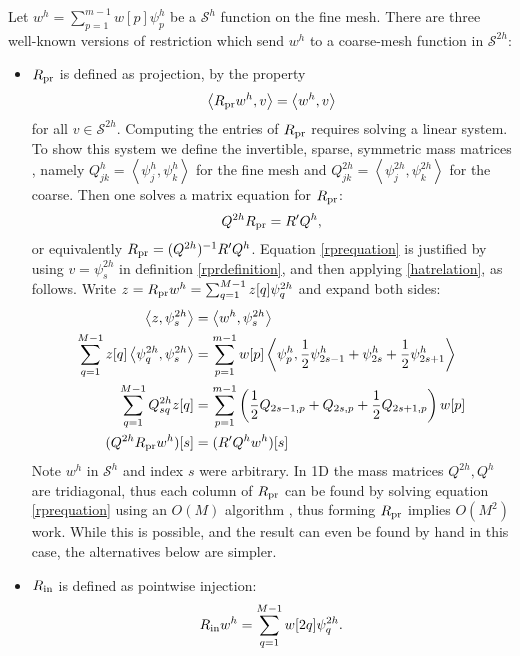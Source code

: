 \documentclass[letterpaper,final,12pt,reqno]{amsart}
\newcommand{\ip}[2]{\left<#1,#2\right>}
\begin{document}
Let $w^h = \sum_{p=1}^{m-1} w[p] \psi_p^{h}$ be a $\mathcal{S}^h$ function on the fine mesh.  There are three well-known versions of restriction which send $w^h$ to a coarse-mesh function in $\mathcal{S}^{2h}$:
\begin{itemize}
\item $R_{\text{pr}}$ is defined as projection, by the property
\begin{equation}
  \ip{\Rpr w^h}{v} = \ip{w^h}{v} \label{rprdefinition}
\end{equation}
for all $v\in \mathcal{S}^{2h}$.  Computing the entries of $R_{\text{pr}}$ requires solving a linear system.  To show this system we define the invertible, sparse, symmetric mass matrices \cite{Elmanetal2014}, namely $Q_{jk}^{h} = \ip{\psi_j^{h}}{\psi_k^{h}}$ for the fine mesh and $Q_{jk}^{2h} = \ip{\psi_j^{2h}}{\psi_k^{2h}}$ for the coarse.  Then one solves a matrix equation for $R_{\text{pr}}$:
\begin{equation}
  Q^{2h} R_{\text{pr}} = R' Q^{h},  \label{rprequation}
\end{equation}
or equivalently $R_{\text{pr}} = (Q^{2h})^{-1} R' Q^{h}$.  Equation \eqref{rprequation} is justified by using $v=\psi_s^{2h}$ in definition \eqref{rprdefinition}, and then applying \eqref{hatrelation}, as follows.  Write $z = R_{\text{pr}} w^h = \sum_{q=1}^{M-1} z[q] \psi_q^{2h}$ and expand both sides:
\begin{align*}
\ip{z}{\psi_s^{2h}} &= \ip{w^h}{\psi_s^{2h}} \\
\sum_{q=1}^{M-1} z[q] \ip{\psi_q^{2h}}{\psi_s^{2h}} &= \sum_{p=1}^{m-1} w[p] \ip{\psi_p^{h}}{\frac{1}{2} \psi_{2s-1}^{h} + \psi_{2s}^{h} + \frac{1}{2} \psi_{2s+1}^{h}} \\
\sum_{q=1}^{M-1} Q_{sq}^{2h} z[q] &= \sum_{p=1}^{m-1} \left(\frac{1}{2} Q_{2s-1,p} + Q_{2s,p} + \frac{1}{2} Q_{2s+1,p}\right) w[p] \\
(Q^{2h} \Rpr w^h)[s] &= (R' Q^h w^h)[s]
\end{align*}
Note $w^h$ in $\mathcal{S}^h$ and index $s$ were arbitrary.  In 1D the mass matrices $Q^{2h},Q^h$ are tridiagonal, thus each column of $R_{\text{pr}}$ can be found by solving equation \eqref{rprequation} using an $O(M)$ algorithm \cite{TrefethenBau1997}, thus forming $R_{\text{pr}}$ implies $O(M^2)$ work.  While this is possible, and the result can even be found by hand in this case, the alternatives below are simpler.
\item $R_{\text{in}}$ is defined as pointwise injection:
\begin{equation}
  R_{\text{in}} w^h = \sum_{q=1}^{M-1} w[2q] \psi_q^{2h}. \label{rindefinition}
\end{equation}

\end{itemize}
\end{document}
